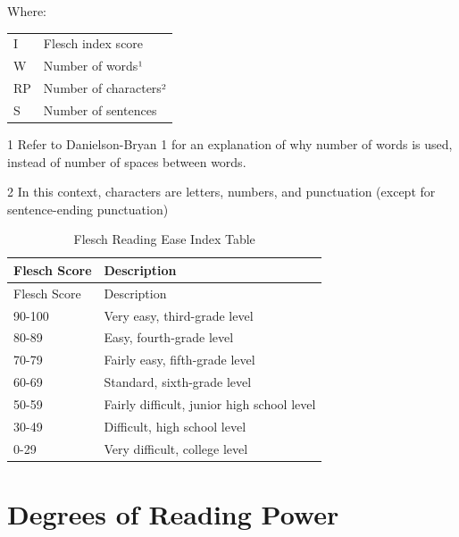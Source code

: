 \documentclass[
]{book}
\theoremstyle{definition}
\theoremstyle{definition}
\theoremstyle{definition}
\theoremstyle{definition}
\theoremstyle{remark}
\begin{document}
Where:

\begin{table}
\centering
\begin{threeparttable}
\begin{tabular}[t]{l>{\raggedright\arraybackslash}p{10cm}}
\toprule
I & Flesch index score\\
W & Number of words¹\\
RP & Number of characters²\\
S & Number of sentences\\
\bottomrule
\end{tabular}
\begin{tablenotes}
\item[1] Refer to Danielson-Bryan 1 for an explanation of why number of words is used, instead of number of spaces between words.
\item[2] In this context, characters are letters, numbers, and punctuation (except for sentence-ending punctuation)
\end{tablenotes}
\end{threeparttable}
\end{table}

\begin{longtable}[]{@{}ll@{}}
\caption{Flesch Reading Ease Index Table}\tabularnewline
\toprule
Flesch Score & Description \\
\midrule
\endfirsthead
\toprule
Flesch Score & Description \\
\midrule
\endhead
90-100 & Very easy, third-grade level \\
80-89 & Easy, fourth-grade level \\
70-79 & Fairly easy, fifth-grade level \\
60-69 & Standard, sixth-grade level \\
50-59 & Fairly difficult, junior high school level \\
30-49 & Difficult, high school level \\
0-29 & Very difficult, college level \\
\bottomrule
\end{longtable}


\newpage

\hypertarget{degrees-of-reading-power}{%
\section{\texorpdfstring{Degrees of Reading Power}{Degrees of Reading Power}}\label{degrees-of-reading-power}}
\end{document}
